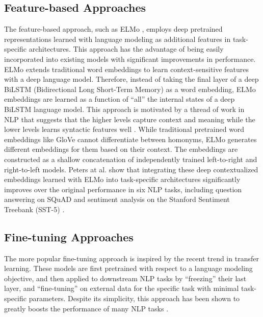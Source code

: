 \subsection{Feature-based Approaches}

The feature-based approach, such as ELMo \cite{peters2018deep}, employs deep pretrained representations learned with language modeling as additional features in task-specific architectures.
This approach has the advantage of being easily incorporated into existing models with significant improvements in performance.
ELMo \cite{peters2018deep} extends traditional word embeddings to learn context-sensitive features with a deep language model.
Therefore, instead of taking the final layer of a deep BiLSTM (Bidirectional Long Short-Term Memory) as a word embedding, ELMo embeddings are learned as a function of ``all'' the internal states of a deep BiLSTM language model.
This approach is motivated by a thread of work in NLP that suggests that the higher levels capture context \cite{melamud2016context2vec} and meaning while the lower levels learns syntactic features well \cite{belinkov2017neural}.
While traditional pretrained word embeddings like GloVe \cite{pennington2014glove} cannot differentiate between homonyms, ELMo generates different embeddings for them based on their context.
The embeddings are constructed as a shallow concatenation of independently trained left-to-right and right-to-left models.
Peters at al. \cite{peters2018deep} show that integrating these deep contextualized embeddings learned with ELMo into task-specific architectures significantly improves over the original performance in six NLP tasks, including question answering on SQuAD \cite{rajpurkar2016squad} and sentiment analysis on the Stanford Sentiment Treebank (SST-5) \cite{socher2013recursive}.

\subsection{Fine-tuning Approaches}

The more popular fine-tuning approach is inspired by the recent trend in transfer learning.
These models are first pretrained with respect to a language modeling objective, and then applied to downstream NLP tasks by ``freezing'' their last layer, and ``fine-tuning'' on external data for the specific task with minimal task-specific parameters.
Despite its simplicity, this approach has been shown to greatly boosts the performance of many NLP tasks .

